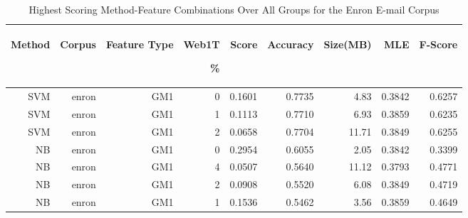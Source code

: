 \begin{table}[htbp!]
	\begin{center}
		\begin{tabular}{ | r | r | r | r | r | r | r | r | r |}
			\hline
			\begin{sideways}Method\end{sideways} & \begin{sideways}Corpus\end{sideways} & \begin{sideways}Feature Type\end{sideways} & \begin{sideways}Web1T\end{sideways} \% & \begin{sideways}Score\end{sideways} & \begin{sideways}Accuracy\end{sideways} & \begin{sideways}Size(MB)\end{sideways} &\begin{sideways}MLE\end{sideways} & \begin{sideways}F-Score\end{sideways}\\ \hline

SVM & enron & GM1 & 0 & 0.1601 & 0.7735 & 4.83 & 0.3842 & 0.6257\\ \hline 
SVM & enron & GM1 & 1 & 0.1113 & 0.7710 & 6.93 & 0.3859 & 0.6235\\ \hline 
SVM & enron & GM1 & 2 & 0.0658 & 0.7704 & 11.71 & 0.3849 & 0.6255\\ \hline 
NB & enron & GM1 & 0 & 0.2954 & 0.6055 & 2.05 & 0.3842 & 0.3399\\ \hline 
NB & enron & GM1 & 4 & 0.0507 & 0.5640 & 11.12 & 0.3793 & 0.4771\\ \hline 
NB & enron & GM1 & 2 & 0.0908 & 0.5520 & 6.08 & 0.3849 & 0.4719\\ \hline 
NB & enron & GM1 & 1 & 0.1536 & 0.5462 & 3.56 & 0.3859 & 0.4649\\ \hline 

\end{tabular}
		\caption{Highest Scoring Method-Feature Combinations Over All Groups for the Enron E-mail Corpus}
		\label{tab:top_enron_by_score_all_groups_under_16mb}
	\end{center}
\end{table}

